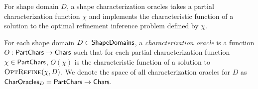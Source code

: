 For shape domain $D$, a shape characterization oracles takes a partial
characterization function $\chi$ and implements the characteristic
function of a solution to the optimal refinement inference problem
defined by $\chi$.
%
\begin{defn}
  \label{defn:char-oracle}
  For each shape domain $D \in \mathsf{ShapeDomains}$, a
  \emph{characterization oracle} is a function $O: \mathsf{PartChars} \to
  \mathsf{Chars}$ such that for each partial characterization function $\chi
  \in \mathsf{PartChars}$, $O(\chi)$ is the characteristic function of a
  solution to $\textsc{OptRefine}(\chi, D)$.
  We denote the space of all characterization oracles for $D$ as
  $\mathsf{CharOracles}_D = \mathsf{PartChars} \to \mathsf{Chars}$.
\end{defn}

